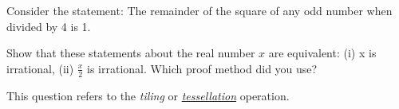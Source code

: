 \documentclass[addpoints]{exam}
\begin{document}
\begin{questions}
\question[5]
  Consider the statement: The remainder of the square of any odd number when divided by 4 is 1.
  

\question[5]
  Show that these statements about the real number $x$ are equivalent: (i) x is irrational, (ii)  $\frac{x}{2}$ is irrational. Which proof method did you use?

  \begin{solution}
  \end{solution}

\question This question refers to the \textit{tiling} or \href{https://en.wikipedia.org/wiki/Tessellation}{\textit{tessellation}} operation.
  

\end{questions}
\end{document}
